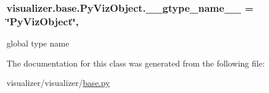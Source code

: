 \subsubsection[{\texorpdfstring{\+\_\+\+\_\+gtype\+\_\+name\+\_\+\+\_\+}{__gtype_name__}}]{\setlength{\rightskip}{0pt plus 5cm}visualizer.\+base.\+Py\+Viz\+Object.\+\_\+\+\_\+gtype\+\_\+name\+\_\+\+\_\+ = \char`\"{}Py\+Viz\+Object\char`\"{}\hspace{0.3cm}{\ttfamily [static]}, {\ttfamily [private]}}\hypertarget{classvisualizer_1_1base_1_1PyVizObject_a4a366e514c88f37d558ccea2c865c94c}{}\label{classvisualizer_1_1base_1_1PyVizObject_a4a366e514c88f37d558ccea2c865c94c}


global type name 



The documentation for this class was generated from the following file\+:\begin{DoxyCompactItemize}
\item 
visualizer/visualizer/\hyperlink{base_8py}{base.\+py}\end{DoxyCompactItemize}
